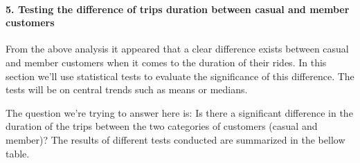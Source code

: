 \documentclass[
]{article}
\begin{document}
\hypertarget{testing-the-difference-of-trips-duration-between-casual-and-member-customers}{%
\paragraph{5. Testing the difference of trips duration between casual
and member
customers}\label{testing-the-difference-of-trips-duration-between-casual-and-member-customers}}

From the above analysis it appeared that a clear difference exists
between casual and member customers when it comes to the duration of
their rides. In this section we'll use statistical tests to evaluate the
significance of this difference. The tests will be on central trends
such as means or medians.

The question we're trying to answer here is: Is there a significant
difference in the duration of the trips between the two categories of
customers (casual and member)? The results of different tests conducted
are summarized in the bellow table.
\end{document}
